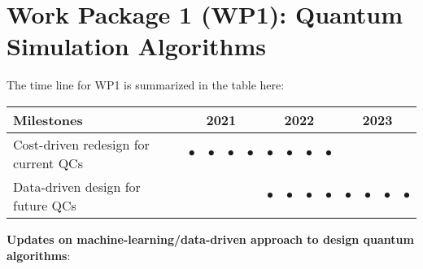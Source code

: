 \documentclass[11pt]{article}
\begin{document}
\section{Work Package 1 (WP1): Quantum Simulation Algorithms}

The time line for WP1 is summarized in the table here:
\begin{footnotesize}
\begin{center}
\begin{tabular}{|l|c|c|c|c|c|c|c|c|c|c|c|c|}
\hline
\multicolumn{1}{|l}{Milestones } & \multicolumn{4}{|c|}{ 2021 } & \multicolumn{4}{c|}{ 2022 } & \multicolumn{4}{c|}{ 2023 } \\
\hline
Cost-driven redesign for current QCs &$\bullet$ &$\bullet$ &$\bullet$ &$\bullet$ & $\bullet$ & $\bullet$&$\bullet$ &$\bullet$ & & & & \\
\hline
Data-driven design for future QCs & & & & & $\bullet$ & $\bullet$ & $\bullet$ & $\bullet$ & $\bullet$ &$\bullet$ &$\bullet$ &$\bullet$ \\
\hline
\end{tabular}
\end{center}
\end{footnotesize}

\textbf{Updates on machine-learning/data-driven approach to design quantum algorithms}:
\end{document}
